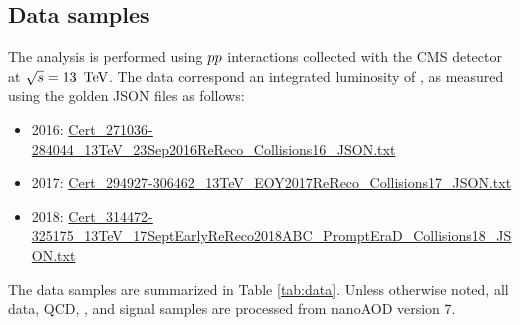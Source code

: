 \subsection{Data samples\label{ss:DataSamples}}

The analysis is performed using $pp$ interactions collected with the CMS detector at $\sqrt{s}=13~\,\text{Te\hspace{-.08em}V}$. The data correspond an integrated luminosity of \intLumi, as measured using the golden JSON files as follows:
\begin{itemize}
\item 2016: {\footnotesize \href{https://cms-service-dqm.web.cern.ch/cms-service-dqm/CAF/certification/Collisions16/13TeV/ReReco/Final/Cert_271036-284044_13TeV_23Sep2016ReReco_Collisions16_JSON.txt}{Cert\_271036-284044\_13TeV\_23Sep2016ReReco\_Collisions16\_JSON.txt}}
\item 2017: {\footnotesize \href{https://cms-service-dqm.web.cern.ch/cms-service-dqm/CAF/certification/Collisions17/13TeV/ReReco/Cert_294927-306462_13TeV_EOY2017ReReco_Collisions17_JSON.txt}{Cert\_294927-306462\_13TeV\_EOY2017ReReco\_Collisions17\_JSON.txt}}
\item 2018: {\scriptsize \href{https://cms-service-dqm.web.cern.ch/cms-service-dqm/CAF/certification/Collisions18/13TeV/ReReco/Cert_314472-325175_13TeV_17SeptEarlyReReco2018ABC_PromptEraD_Collisions18_JSON.txt}{Cert\_314472-325175\_13TeV\_17SeptEarlyReReco2018ABC\_PromptEraD\_Collisions18\_JSON.txt}}
\end{itemize}
The data samples are summarized in Table \ref{tab:data}. Unless otherwise noted, all data, QCD, \ttbar, and signal samples are processed from nanoAOD version 7. 

